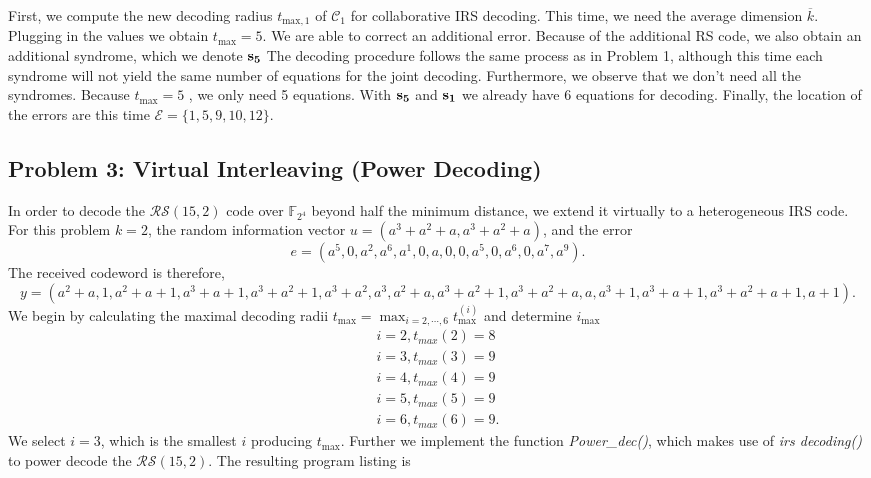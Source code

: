 \documentclass{article}
\begin{document}
First, we compute the new decoding radius $t_{\text{max},1}$ of $\mathcal{C}_1$ for collaborative IRS decoding. This time, we need the average dimension $\overline{k}$. Plugging in the values we obtain $t_{\text{max}} = 5$. We are able to correct an additional error. Because of the additional RS code, we also obtain an additional syndrome, which we denote $\vb{s_5}$
The decoding procedure follows the same process as in Problem 1, although this time each syndrome will not yield the same number of equations for the joint decoding. Furthermore, we observe that we don't need all the syndromes. Because  $t_{\text{max}} = 5$ , we only need 5 equations. With  $\vb{s_5}$  and  $\vb{s_1}$  we already have 6 equations for decoding. Finally, the location of the errors are this time $\mathcal{E} = \{1, 5, 9, 10, 12\}$.

\subsection*{Problem 3: Virtual Interleaving (Power Decoding)}
In order to decode the $\mathcal{RS}(15, 2)$ code over $\mathbb{F}_{2^4}$ beyond half the minimum distance, we extend it virtually to a heterogeneous IRS code. For this problem $k=2$, the random information vector $u=(a^3 + a^2 + a, a^3 + a^2 + a)$, and the error
\begin{equation*}
e=(a^5, 0, a^2, a^6, a^1, 0, a, 0, 0, a^5, 0, a^6, 0, a^7, a^9).
\end{equation*}
The received codeword is therefore,
\begin{equation*}
y=(a^2 + a, 1, a^2 + a + 1, a^3 + a + 1, a^3 + a^2 + 1, a^3 + a^2, a^3, a^2 + a, a^3 + a^2 + 1, a^3 + a^2 + a, a, a^3 + 1, a^3 + a + 1, a^3 + a^2 + a + 1, a + 1).
\end{equation*} 
We begin by calculating the maximal decoding radii $t_{\text{max}} =\max_{i=2,\cdots,6}t_{\text{max}}^{(i)}$ and determine $i_{\text{max}}$
\begin{align*}
i=2, t_{max}(2) = 8\\
i=3, t_{max}(3) = 9\\
i=4, t_{max}(4) = 9\\
i=5, t_{max}(5) = 9\\
i=6, t_{max}(6) = 9.
\end{align*}
We select $i=3$, which is the smallest $i$ producing $t_{\text{max}}$. Further we implement the function \textit{Power\_dec()}, which makes use of \textit{irs decoding()} to power decode the $\mathcal{RS}(15, 2)$. The resulting program listing is
\end{document}
